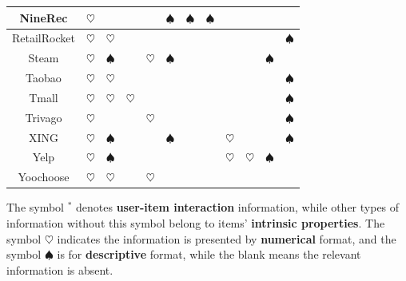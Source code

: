 \documentclass[lettersize,journal]{IEEEtran}
\begin{document}
\begin{table}[th]
\begin{tabular}{c|c|c|c|    c|c|c|c|    c|c|c|c}
\hline
{NineRec} & {$\heartsuit$}  &                     & {} & {} & {$\spadesuit$}                     & {$\spadesuit$} & {$\spadesuit$}  & {}  & {}  & {} & {} \\ 
\hline
{RetailRocket} & {$\heartsuit$}  & {$\heartsuit$}   & {} & {} & {} & {} & {}     & {}  & {} & {} & {$\spadesuit$}  \\ 
\hline
{Steam}  & {$\heartsuit$}  & {$\spadesuit$}  & {}    & {$\heartsuit$}  & {$\spadesuit$}  & {} & {}  & {}  & {} & {$\spadesuit$} & {}    \\ 
\hline
{Taobao}     & {$\heartsuit$}    & {$\heartsuit$}                     & {} & {} & {} & {} & {}      & {} & {} & {} & {$\spadesuit$}                 \\ 
\hline
{Tmall}       & {$\heartsuit$}     & {$\heartsuit$}                     & {$\heartsuit$}                     & {} & {} & {} & {}   & {}  & {} & {} & {$\spadesuit$}  \\ 
\hline
{Trivago}   & {$\heartsuit$}     & {} & {} & {$\heartsuit$}                     & {} & {} & {}     & {}  & {} & {} & {$\spadesuit$} \\ 
\hline
{XING} & {$\heartsuit$}  &{$\spadesuit$} &{} &{} &{$\spadesuit$}   & {}  & {}   & {$\heartsuit$} & {}  & {}  & {$\spadesuit$}    \\ 
\hline
{Yelp}       & {$\heartsuit$}    & {$\spadesuit$}                     & {} & {} & {} & {} & {}     & {$\heartsuit$}  & {$\heartsuit$}   & {$\spadesuit$}  & {}   \\ 
\hline
{Yoochoose}   & {$\heartsuit$}    & {$\heartsuit$}                     & {} & {$\heartsuit$}                     & {} & {} & {}   & {}   & {} & {} & {}  \\
\bottomrule
\end{tabular}\vspace{3px}
{The symbol $^*$ denotes \textbf{user-item interaction} information, while other types of information without this symbol belong to items' \textbf{intrinsic properties}. The symbol $\heartsuit$ indicates the information is presented by \textbf{numerical} format, and the symbol $\spadesuit$ is for \textbf{descriptive} format, while the blank means the relevant information is absent.}
\label{datasets}
\end{table}
\end{document}
